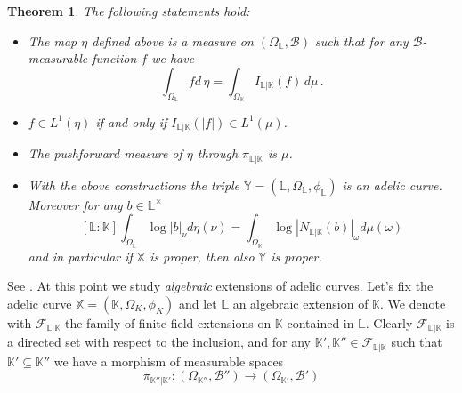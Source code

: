 \documentclass[10 pt,a4paper]{article}
\theoremstyle{plain}
\newtheorem{thm}{Theorem}[section]
\theoremstyle{definition}
\theoremstyle{named}
\begin{document}
\begin{thm}\label{pullback_mea}
The following statements hold:
\begin{itemize}
\item[$(1)$] The map $\eta$ defined above is a measure on $(\Omega_{\mathbb L},\mathcal B)$ such that for any $\mathcal B$-measurable function $f$ we have
$$\int_{\Omega_\mathbb L}fd\,\eta=\int_{\Omega_\mathbb K}I_{\mathbb L|\mathbb K}(f)\, d\mu\,.$$
\item[$(2)$] $f\in L^1(\eta)$ if and only if $I_{\mathbb L|\mathbb K}(|f|)\in L^1(\mu)$.
\item[$(3)$] The pushforward measure of $\eta$ through $\pi_{\mathbb L|\mathbb K}$ is $\mu$.
\item[$(4)$] With the above constructions the triple $\mathbb Y=(\mathbb L,\Omega_{\mathbb L},\phi_{\mathbb L})$ is an adelic curve. Moreover for any $b\in\mathbb L^\times$
\begin{equation}\label{extproper}
[\mathbb L:\mathbb K]\int_{\Omega_\mathbb L}\log|b|_\nu d\eta(\nu)=\int_{\Omega_\mathbb K}\log|N_{\mathbb L|\mathbb K}(b)|_\omega d\mu(\omega)
\end{equation}
and in particular if $\mathbb X$ is proper, then also $\mathbb Y$ is proper.

\end{itemize}
\end{thm}
\proof
See \cite[Theorem 3.3.7]{Ch-Mo}.
\endproof
At this point we study  \emph{algebraic} extensions of adelic curves. Let's fix the adelic curve $\mathbb X=(\mathbb K,\Omega_K,\phi_K)$ and let $\mathbb L$ an algebraic extension of $\mathbb K$. We denote with $\mathcal F_{\mathbb L|\mathbb K}$ the family of finite field extensions on $\mathbb K$ contained in $\mathbb L$. Clearly $\mathcal F_{\mathbb L|\mathbb K}$ is a directed set with respect to the inclusion, and for any $\mathbb K',\mathbb K''\in\mathcal F_{\mathbb L|\mathbb K}$  such that  $\mathbb K'\subseteq\mathbb K''$ we have a morphism of measurable spaces 
$$\pi_{\mathbb K''|\mathbb K'}\colon (\Omega_{\mathbb K''}, \mathcal B'')\to (\Omega_{\mathbb K'}, \mathcal B')$$
\end{document}
